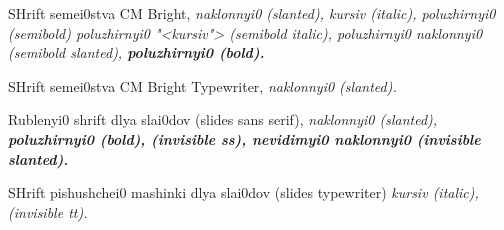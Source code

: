 \documentclass[russian,english%
]{book}
\begin{document}
\bigskip
{}%
\mdseries\upshape
{SHrift semei0stva}  CM Bright,
\slshape
{naklonnyi0} (slanted),
\itshape
{kursiv} (italic),
\upshape
{poluzhirnyi0} (semibold)
\itshape
{poluzhirnyi0 "<kursiv">} (semibold italic),
\slshape
{poluzhirnyi0 naklonnyi0} (semibold slanted),
\bfseries\upshape
{poluzhirnyi0} (bold).

\bigskip
{}%
\mdseries\upshape
{SHrift semei0stva} CM Bright Typewriter,
\slshape
{naklonnyi0} (slanted).

\bigskip
{}%
\mdseries\upshape
{Rublenyi0 shrift dlya slai0dov} (slides sans serif),
\slshape
{naklonnyi0} (slanted),
\bfseries\upshape
{poluzhirnyi0} (bold),
 (invisible ss),
{\selectfont
{nevidimyi0 naklonnyi0}} {\slshape (invisible slanted)}.

\bigskip
{}%
\mdseries\upshape
{SHrift pishushchei0 mashinki dlya slai0dov} (slides typewriter)
\itshape
{kursiv} (italic),
 {\upshape (invisible tt}).
\end{document}
